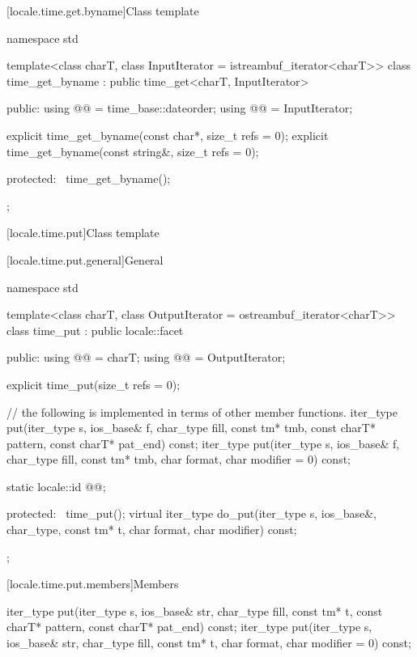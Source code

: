 [locale.time.get.byname]{Class template }

%
\begin{codeblock}
namespace std {
  template<class charT, class InputIterator = istreambuf_iterator<charT>>
  class time_get_byname : public time_get<charT, InputIterator> {
  public:
    using @@ = time_base::dateorder;
    using @@ = InputIterator;

    explicit time_get_byname(const char*, size_t refs = 0);
    explicit time_get_byname(const string&, size_t refs = 0);

  protected:
    ~time_get_byname();
  };
}
\end{codeblock}

[locale.time.put]{Class template }

[locale.time.put.general]{General}

%
\begin{codeblock}
namespace std {
  template<class charT, class OutputIterator = ostreambuf_iterator<charT>>
  class time_put : public locale::facet {
  public:
    using @@ = charT;
    using @@ = OutputIterator;

    explicit time_put(size_t refs = 0);

    // the following is implemented in terms of other member functions.
    iter_type put(iter_type s, ios_base& f, char_type fill, const tm* tmb,
                  const charT* pattern, const charT* pat_end) const;
    iter_type put(iter_type s, ios_base& f, char_type fill,
                  const tm* tmb, char format, char modifier = 0) const;

    static locale::id @@;

  protected:
    ~time_put();
    virtual iter_type do_put(iter_type s, ios_base&, char_type, const tm* t,
                             char format, char modifier) const;
  };
}
\end{codeblock}

[locale.time.put.members]{Members}

%
\begin{itemdecl}
iter_type put(iter_type s, ios_base& str, char_type fill, const tm* t,
              const charT* pattern, const charT* pat_end) const;
iter_type put(iter_type s, ios_base& str, char_type fill, const tm* t,
              char format, char modifier = 0) const;
\end{itemdecl}

